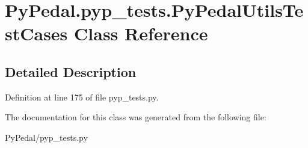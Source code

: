 \hypertarget{classPyPedal_1_1pyp__tests_1_1PyPedalUtilsTestCases}{
\section{PyPedal.pyp\_\-tests.PyPedalUtilsTestCases Class Reference}
\label{classPyPedal_1_1pyp__tests_1_1PyPedalUtilsTestCases}
}


\subsection{Detailed Description}


Definition at line 175 of file pyp\_\-tests.py.



The documentation for this class was generated from the following file:\begin{DoxyCompactItemize}
\item 
PyPedal/pyp\_\-tests.py\end{DoxyCompactItemize}

